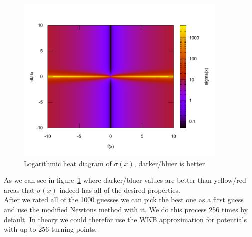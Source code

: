 \documentclass[11pt,DIV=10,final]{scrreprt} %
\begin{document}
\begin{figure}[H]
  \centering
  \includegraphics[width=0.9\textwidth]{plots/newton_rating_func.pdf}
  \caption{Logarithmic heat diagram of $\sigma(x)$, darker/bluer is better}\label{fig:simga-heat}
\end{figure}
As we can see in figure~\ref{fig:simga-heat} where darker/bluer values are better than yellow/red areas that $\sigma(x)$ indeed has all of the desired properties.
\\
After we rated all of the 1000 guesses we can pick the best one as a first guess and use the modified Newtons method with it. We do this process 256 times by default. In theory we could therefor use the WKB approximation for potentials with up to 256 turning points.
\end{document}
